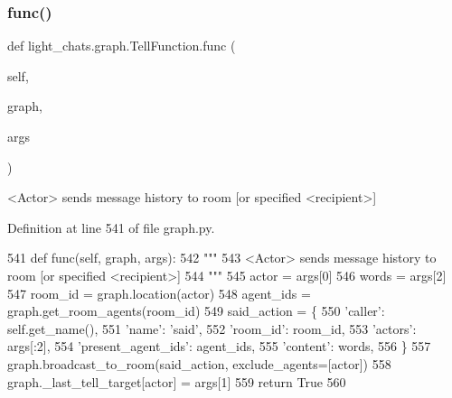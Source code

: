 \subsubsection{\texorpdfstring{func()}{func()}}
{\footnotesize\ttfamily def light\+\_\+chats.\+graph.\+Tell\+Function.\+func (\begin{DoxyParamCaption}\item[{}]{self,  }\item[{}]{graph,  }\item[{}]{args }\end{DoxyParamCaption})}

\begin{DoxyVerb}<Actor> sends message history to room [or specified <recipient>]
\end{DoxyVerb}
 

Definition at line 541 of file graph.\+py.


\begin{DoxyCode}
541     \textcolor{keyword}{def }func(self, graph, args):
542         \textcolor{stringliteral}{"""}
543 \textcolor{stringliteral}{        <Actor> sends message history to room [or specified <recipient>]}
544 \textcolor{stringliteral}{        """}
545         actor = args[0]
546         words = args[2]
547         room\_id = graph.location(actor)
548         agent\_ids = graph.get\_room\_agents(room\_id)
549         said\_action = \{
550             \textcolor{stringliteral}{'caller'}: self.get\_name(),
551             \textcolor{stringliteral}{'name'}: \textcolor{stringliteral}{'said'},
552             \textcolor{stringliteral}{'room\_id'}: room\_id,
553             \textcolor{stringliteral}{'actors'}: args[:2],
554             \textcolor{stringliteral}{'present\_agent\_ids'}: agent\_ids,
555             \textcolor{stringliteral}{'content'}: words,
556         \}
557         graph.broadcast\_to\_room(said\_action, exclude\_agents=[actor])
558         graph.\_last\_tell\_target[actor] = args[1]
559         \textcolor{keywordflow}{return} \textcolor{keyword}{True}
560 
\end{DoxyCode}
\mbox{\label{classlight__chats_1_1graph_1_1TellFunction_a1ce8fd5a8ee86a01e68e9115f8cc9108}} 
